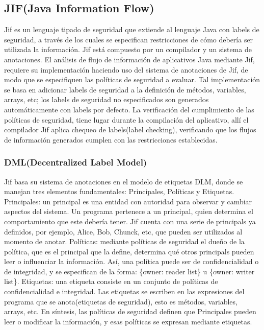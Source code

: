 \subsection{JIF(Java Information Flow)}
Jif es un lenguaje tipado de seguridad que extiende al lenguaje Java con labels
de seguridad, a través de los cuales se especifican restricciones de cómo
debería ser utilizada la información. Jif está compuesto por un compilador y un
sistema de anotaciones.\newline
El análisis de flujo de información de aplicativos Java mediante Jif, requiere
su implementación haciendo uso del sistema de anotaciones de Jif, de modo que se
especifiquen las políticas de seguridad a evaluar.
Tal implementación se basa en adicionar labels de seguridad a la definición
de métodos, variables, arrays, etc; los labels de seguridad no especificados son
generados automáticamente con labels por defecto.\newline
La verificación del cumplimiento de las políticas de seguridad, tiene lugar
durante la compilación del aplicativo, allí el compilador Jif aplica chequeo de
labels(label checking)\cite{jifRef},  verificando que los flujos de información
generados cumplen con las restricciones establecidas.

\subsubsection{DML(Decentralized Label Model)}
Jif basa su sistema de anotaciones en el modelo de etiquetas DLM, donde se
manejan tres elementos fundamentales: Principales, Políticas y
Etiquetas.\newline 
Principales: un principal es una entidad con autoridad para observar y cambiar
aspectos del sistema. Un programa pertenece a un principal, quien determina el
comportamiento que este debería tener. Jif cuenta con una serie de principals ya
definidos, por ejemplo, Alice, Bob, Chunck, etc, que pueden ser
utilizados al momento de anotar.\newline 
Políticas: mediante políticas de seguridad el dueño de la política, que es el
principal que la define, determina qué otros principals pueden leer o
influenciar la información. Así, una política puede ser de confidencialidad o de
integridad, y se especifican de la forma: \{owner: reader list\} u
\{owner: writer list\}.\newline 
Etiquetas: una etiqueta consiste en un conjunto de políticas de confidencialidad
e integridad. Las etiquetas se escriben en las expresiones del programa que se
anota(etiquetas de seguridad), esto es métodos, variables, arrays, etc.\newline 
En síntesis, las políticas de seguridad definen que Principales pueden leer o
modificar la información, y esas políticas se expresan mediante
etiquetas.

